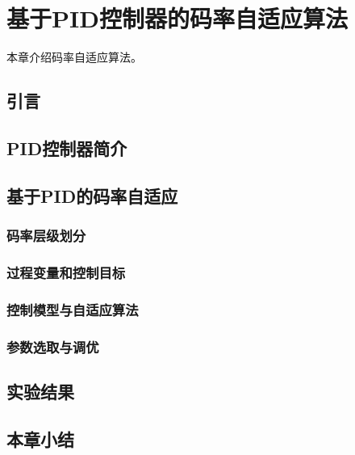 \chapter{基于PID控制器的码率自适应算法}
本章介绍码率自适应算法。

\section{引言}

\section{PID控制器简介}

\section{基于PID的码率自适应}

\subsection{码率层级划分}

\subsection{过程变量和控制目标}

\subsection{控制模型与自适应算法}

\subsection{参数选取与调优}

\section{实验结果}

\section{本章小结}